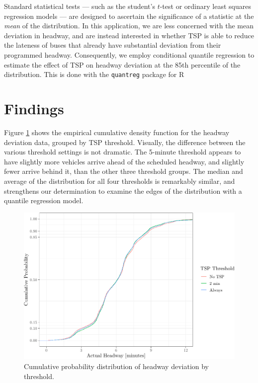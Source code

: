 \documentclass[3p, authoryear, review]{elsarticle} %
\makeatletter
\def\maxwidth{\ifdim\Gin@nat@width>\linewidth\linewidth
\else\Gin@nat@width\fi}
\let\Oldincludegraphics\includegraphics
\renewcommand{\includegraphics}[1]{\Oldincludegraphics[width=\maxwidth]{#1}}
\makeatother
\begin{document}
Standard statistical tests --- such as the student's \(t\)-test or
ordinary least squares regression models --- are designed to ascertain the
significance of a statistic at the \emph{mean} of the distribution. In this
application, we are less concerned with the mean deviation in headway, and are
instead interested in whether TSP is able to reduce the lateness of buses that
already have substantial deviation from their programmed headway. Consequently,
we employ conditional quantile regression \citep{koenker2001quantile} to estimate the
effect of TSP on headway deviation at the 85th percentile of the distribution.
This is done with the \texttt{quantreg} package for R \citep{quantreg, R}

\hypertarget{findings}{%
\section{Findings}\label{findings}}

Figure \ref{fig:ecdf} shows the empirical cumulative density function for the
headway deviation data, grouped by TSP threshold. Visually, the difference
between the various threshold settings is not dramatic. The 5-minute
threshold appears to have slightly more vehicles arrive ahead of the
scheduled headway, and slightly fewer arrive behind it, than the other three
threshold groups. The median and average of the distribution for all four
thresholds is remarkably similar, and strengthens our determination to
examine the edges of the distribution with a quantile regression model.

\begin{figure}
\centering
\includegraphics{uvx_headways_files/figure-latex/ecdf-1.pdf}
\caption{\label{fig:ecdf}Cumulative probability distribution of headway deviation by threshold.}
\end{figure}
\end{document}
